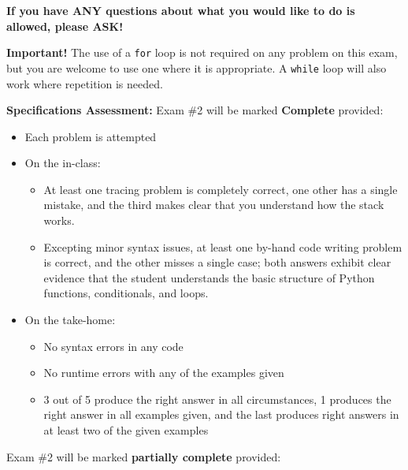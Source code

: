 \documentclass{article}
\newcommand{\vs}{\vspace{0.1in}}
\begin{document}
 \vs

 \textbf{If you have ANY questions about what you would like to do is allowed, please ASK!}

 \vs

 \vs

 \textbf{Important!} The use of a \verb|for| loop is not required on any problem on this exam, but you are welcome to use one where it is appropriate. A \verb|while| loop will also work where repetition is needed.


\textbf{Specifications Assessment:}  Exam \#2 will be marked \textbf{Complete} provided:

\begin{itemize}
\item	Each problem is attempted
\item	On the in-class:
\begin{itemize}
\item	At least one tracing problem is completely correct, one other has a single mistake, and the third makes clear that you understand how the stack works.
\item  Excepting minor syntax issues, at least one by-hand code writing problem is correct, and the other misses a single case; both answers exhibit clear evidence that the student understands the basic structure of Python functions, conditionals, and loops.
\end{itemize}
\item	On the take-home:
\begin{itemize}
\item	No syntax errors in any code
\item	No runtime errors with any of the examples given
\item	3 out of 5 produce the right answer in all circumstances, 1 produces the right answer in all examples given, and the last produces right answers in at least two of the given examples
\end{itemize}
\end{itemize}
Exam \#2 will be marked \textbf{partially complete} provided:
\end{document}
